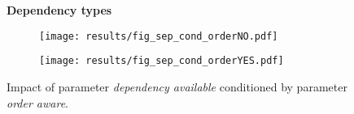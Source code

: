 


\begin{figure}[htb!]
\centering
\textbf{Dependency types}\par\medskip
\begin{subfigure}{.5\textwidth}
  \centering
  \texttt{[image: results/fig\_sep\_cond\_orderNO.pdf]}
\end{subfigure}%
\begin{subfigure}{.5\textwidth}
  \centering
  \texttt{[image: results/fig\_sep\_cond\_orderYES.pdf]}
\end{subfigure}
\caption{Impact of parameter \textit{dependency available} conditioned by parameter \textit{order aware}.}
\label{fig:fig_sep_dep}
\end{figure}


